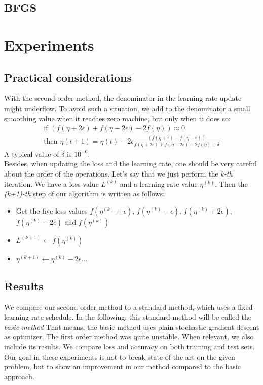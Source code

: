 \documentclass{article}
\begin{document}
  
  \subsection{BFGS}
  
  \section{Experiments}
  
  \subsection{Practical considerations}
  
  With the second-order method, the denominator in the learning rate update might underflow. To avoid such a situation, we add to the denominator a small smoothing value when it reaches zero machine, but only when it does so:\\
  \begin{align}
  \text{if } (f(\eta+2\epsilon)+f(\eta-2\epsilon)-2f(\eta)) \approx 0\\
  \text{then }\eta(t+1) = \eta(t) - 2\epsilon\frac{(f(\eta+\epsilon)-f(\eta-\epsilon))}{f(\eta+2\epsilon)+f(\eta-2\epsilon)-2f(\eta)+\delta}
  \end{align}
  A typical value of $\delta$ is $10^{-6}$. \\
  
  Besides, when updating the loss and the learning rate, one should be very careful about the order of the operations. Let's say that we just perform the \emph{k-th} iteration. We have a loss value $L^{(k)}$ and a learning rate value $\eta^{(k)}$. Then the \emph{(k+1)-th} step of our algorithm is written as follows:\\
  \begin{itemize}
  	\item Get the five loss values $f(\eta^{(k)}+\epsilon)$, $f(\eta^{(k)}-\epsilon)$, $f(\eta^{(k)}+2\epsilon)$, $f(\eta^{(k)}-2\epsilon)$ and $f(\eta^{(k)})$
  	\item $L^{(k+1)} \leftarrow f(\eta^{(k)})$
  	\item $\eta^{(k+1)} \leftarrow \eta^{(k)} -2\epsilon...$
  \end{itemize}
  
  \subsection{Results} 
  
  We compare our second-order method to a standard method, which uses a fixed learning rate schedule. In the following, this standard method will be called the \emph{basic method} That means, the basic method uses plain stochastic gradient descent as optimizer. The first order method was quite unstable. When relevant, we also include its results. We compare loss and accuracy on both training and test sets. Our goal in these experiments is not to break state of the art on the given problem, but to show an improvement in our method compared to the basic approach. 
 
\end{document}
